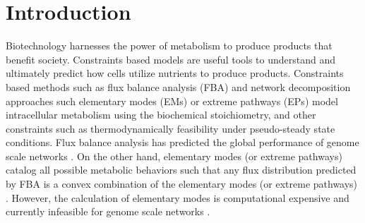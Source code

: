 \documentclass[10pt,twocolumn,twoside,final]{IEEEtran}
\begin{document}
\section{Introduction}

Biotechnology harnesses the power of metabolism to produce products that benefit society.
Constraints based models are useful tools to understand and ultimately predict how cells utilize nutrients to produce products.
Constraints based methods such as flux balance analysis (FBA) \cite{2010_orth_NatBiotech} and network decomposition approaches such elementary modes (EMs) \cite{Schuster:2000aa}
or extreme pathways (EPs) \cite{Schilling:2000aa}
model intracellular metabolism using the biochemical stoichiometry, and other constraints such as thermodynamically feasibility under pseudo-steady state conditions.
Flux balance analysis has predicted the global performance of genome scale networks \cite{Covert:2004aa}.
On the other hand, elementary modes (or extreme pathways) catalog all possible metabolic behaviors such that any flux distribution predicted by FBA is a convex combination
of the elementary modes (or extreme pathways) \cite{Wiback:2003aa}.
However, the calculation of elementary modes is computational expensive and currently infeasible for genome scale networks \cite{2004_lee_varner_ko_ieee}.
\end{document}
